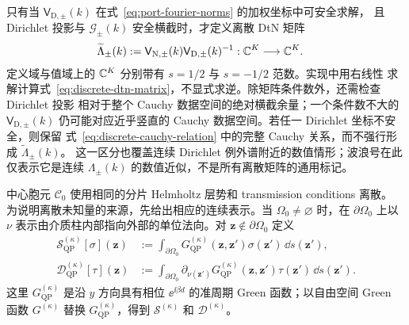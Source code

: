 只有当 $\mathsf V_{\mathrm D,\pm}(k)$ 在式~\eqref{eq:port-fourier-norms} 的加权坐标中可安全求解，
且 Dirichlet 投影与 $\mathcal G_\pm(k)$ 安全横截时，才定义离散 DtN 矩阵
\begin{align}
  \widetilde{\Lambda}_\pm(k)
  &:=\mathsf V_{\mathrm N,\pm}(k)
    \mathsf V_{\mathrm D,\pm}(k)^{-1}:
  \mathbb{C}^K\longrightarrow\mathbb{C}^K.
  \label{eq:discrete-dtn-matrix}
\end{align}
定义域与值域上的 $\mathbb{C}^K$ 分别带有 $s=1/2$ 与 $s=-1/2$ 范数。实现中用右线性
求解计算式~\eqref{eq:discrete-dtn-matrix}，不显式求逆。除矩阵条件数外，还需检查 Dirichlet 投影
相对于整个 Cauchy 数据空间的绝对横截余量；一个条件数不大的 $\mathsf V_{\mathrm D,\pm}(k)$
仍可能对应近乎竖直的 Cauchy 数据空间。若任一 Dirichlet 坐标不安全，则保留
式~\eqref{eq:discrete-cauchy-relation} 中的完整 Cauchy 关系，而不强行形成 $\widetilde{\Lambda}_\pm(k)$。
这一区分也覆盖连续 Dirichlet 例外谱附近的数值情形；波浪号在此仅表示它是连续
$\Lambda_\pm(k)$ 的数值近似，不是所有离散矩阵的通用标记。

中心胞元 $\mathcal C_0$ 使用相同的分片 Helmholtz 层势和 transmission conditions 离散。
为说明离散未知量的来源，先给出相应的连续表示。当 $\Omega_0\ne\varnothing$ 时，在
$\partial\Omega_0$ 上以 $\nu$ 表示由介质柱内部指向外部的单位法向。对
$\mathbf z\notin\partial\Omega_0$ 定义
\begin{align*}
  \mathcal S_{\mathrm{QP}}^{(\kappa)}[\sigma](\mathbf z)
  &:=\int_{\partial\Omega_0}
    G_{\mathrm{QP}}^{(\kappa)}(\mathbf z,\mathbf z')
    \sigma(\mathbf z')\,\dd s(\mathbf z'),\\
  \mathcal D_{\mathrm{QP}}^{(\kappa)}[\tau](\mathbf z)
  &:=\int_{\partial\Omega_0}
    \partial_{\nu(\mathbf z')}G_{\mathrm{QP}}^{(\kappa)}(\mathbf z,\mathbf z')
    \tau(\mathbf z')\,\dd s(\mathbf z').
\end{align*}
这里 $G_{\mathrm{QP}}^{(\kappa)}$ 是沿 $y$ 方向具有相位
$\ee^{\ii\beta d}$ 的准周期 Green 函数；以自由空间 Green 函数
$G^{(\kappa)}$ 替换 $G_{\mathrm{QP}}^{(\kappa)}$，得到
$\mathcal S^{(\kappa)}$ 和 $\mathcal D^{(\kappa)}$。

